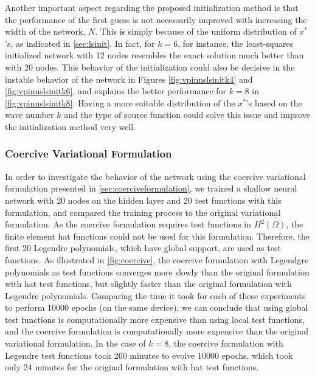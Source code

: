 Another important aspect regarding the proposed initialization method is that the performance of the first guess is not necessarily improved with increasing the width of the network, $N$. This is simply because of the uniform distribution of $x^{*}$'s, as indicated in \autoref{sec:lsinit}. In fact, for $k=6$, for instance, the least-squares initialized network with 12 nodes resembles the exact solution much better than with 20 nodes. This behavior of the initialization could also be decisive in the instable behavior of the network in Figures \ref{fig:vpinnslsinitk4} and \ref{fig:vpinnslsinitk6}, and explains the better performance for $k=8$ in \autoref{fig:vpinnslsinitk8}. Having a more suitable distribution of the $x^{*}$'s based on the wave number $k$ and the type of source function could solve this issue and improve the initialization method very well.

\subsubsection{Coercive Variational Formulation}\label{sec:coerciveresults}
In order to investigate the behavior of the network using the coercive variational formulation presented in \autoref{sec:coerciveformulation}, we trained a shallow neural network with 20 nodes on the hidden layer and 20 test functions with this formulation, and compared the training process to the original variational formulation. As the coercive formulation requires test functions in $H^2(\Omega)$, the finite element hat functions could not be used for this formulation. Therefore, the first 20 Legendre polynomials, which have global support, are used as test functions. As illustrated in \autoref{fig:coercive}, the coercive formulation with Legendgre polynomials as test functions converges more slowly than the original formulation with hat test functions, but slightly faster than the original formulation with Legendre polynomials. Comparing the time it took for each of these experiments to perform 10000 epochs (on the same device), we can conclude that using global test functions is computationally more expensive than using local test functions, and the coercive formulation is computationally more expensive than the original variational formulation. In the case of $k=8$, the coercive formulation with Legendre test functions took 260 minutes to evolve 10000 epochs, which took only 24 minutes for the original formulation with hat test functions.

